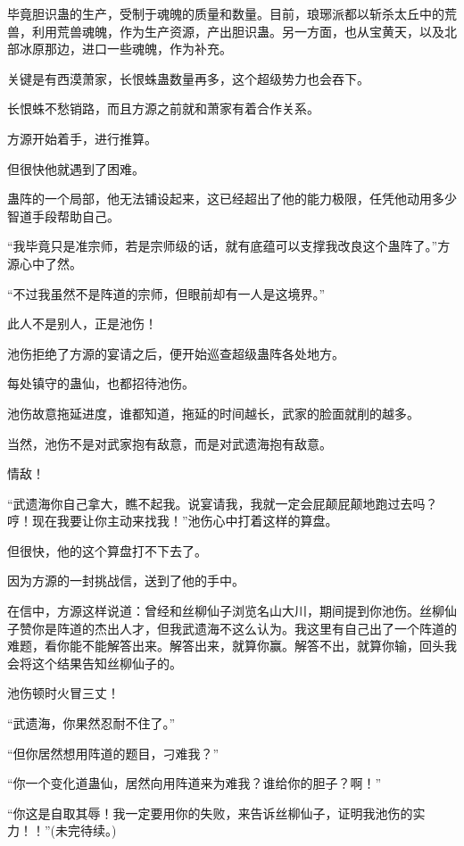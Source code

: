 \begin{this_body}
毕竟胆识蛊的生产，受制于魂魄的质量和数量。目前，琅琊派都以斩杀太丘中的荒兽，利用荒兽魂魄，作为生产资源，产出胆识蛊。另一方面，也从宝黄天，以及北部冰原那边，进口一些魂魄，作为补充。

关键是有西漠萧家，长恨蛛蛊数量再多，这个超级势力也会吞下。

长恨蛛不愁销路，而且方源之前就和萧家有着合作关系。

方源开始着手，进行推算。

但很快他就遇到了困难。

蛊阵的一个局部，他无法铺设起来，这已经超出了他的能力极限，任凭他动用多少智道手段帮助自己。

“我毕竟只是准宗师，若是宗师级的话，就有底蕴可以支撑我改良这个蛊阵了。”方源心中了然。

“不过我虽然不是阵道的宗师，但眼前却有一人是这境界。”

此人不是别人，正是池伤！

池伤拒绝了方源的宴请之后，便开始巡查超级蛊阵各处地方。

每处镇守的蛊仙，也都招待池伤。

池伤故意拖延进度，谁都知道，拖延的时间越长，武家的脸面就削的越多。

当然，池伤不是对武家抱有敌意，而是对武遗海抱有敌意。

情敌！

“武遗海你自己拿大，瞧不起我。说宴请我，我就一定会屁颠屁颠地跑过去吗？哼！现在我要让你主动来找我！”池伤心中打着这样的算盘。

但很快，他的这个算盘打不下去了。

因为方源的一封挑战信，送到了他的手中。

在信中，方源这样说道：曾经和丝柳仙子浏览名山大川，期间提到你池伤。丝柳仙子赞你是阵道的杰出人才，但我武遗海不这么认为。我这里有自己出了一个阵道的难题，看你能不能解答出来。解答出来，就算你赢。解答不出，就算你输，回头我会将这个结果告知丝柳仙子的。

池伤顿时火冒三丈！

“武遗海，你果然忍耐不住了。”

“但你居然想用阵道的题目，刁难我？”

“你一个变化道蛊仙，居然向用阵道来为难我？谁给你的胆子？啊！”

“你这是自取其辱！我一定要用你的失败，来告诉丝柳仙子，证明我池伤的实力！！”(未完待续。)

\end{this_body}

